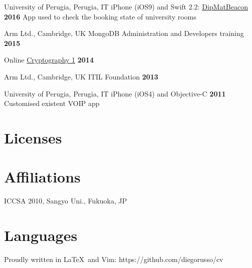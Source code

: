 \documentclass[10pt,a4paper,sans]{moderncv}
\begin{document}
    {University of Perugia, Perugia, IT}
    {iPhone (iOS9) and Swift 2.2:
        \href{https://github.com/diegorusso/DipMatBeacon}{DipMatBeacon}}
    {\textbf{2016}}
    {App used to check the booking state of university rooms}
    {}

    {Arm Ltd., Cambridge, UK}
    {MongoDB Administration and Developers training}
    {\textbf{2015}}
    {}
    {}

    {Online}
    {\href{http://bit.ly/coursera-crypto1}{Cryptography 1}}
    {\textbf{2014}}
    {}
    {}

    {Arm Ltd., Cambridge, UK}
    {ITIL Foundation}
    {\textbf{2013}}
    {}
    {}

\cventry{}
    {University of Perugia, Perugia, IT}
    {iPhone (iOS4) and Objective-C}
    {\textbf{2011}}
    {Customised existent VOIP app}
    {}

\section{Licenses}


\section{Affiliations}
        {ICCSA 2010, Sangyo Uni., Fukuoka, JP}

\section{Languages}

\begin{center}
Proudly written in \LaTeX\ and Vim: https://github.com/diegorusso/cv
\end{center}
\end{document}
